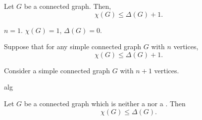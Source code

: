 \begin{frame}{}
  \begin{theorem}
    Let $G$ be a  connected graph. Then,
    \[
      \chi(G) \le \Delta(G) + 1.
    \]
  \end{theorem}

  \pause
  \begin{center}

    \pause
    \vspace{0.20cm}
    \begin{description}
      \setlength{\itemsep}{5pt}
      \item[Basis Step:] $n = 1$. $\chi(G) = 1$, $\Delta(G) = 0$.
      \item[Induction Hypothesis:] Suppose that for any simple connected graph $G$
        with $n$ vertices,
        \[
          \chi(G) \le \Delta(G) + 1.
        \]
      \item[Induction Step:] Consider a simple connected graph $G$ with $n+1$ vertices.
    \end{description}
  \end{center}
\end{frame}

\begin{frame}{}
  alg
\end{frame}

\begin{frame}{}
  \begin{theorem}
    Let $G$ be a  connected graph which is neither a 
    nor a . Then
    \[
      \chi(G) \le \Delta(G).
    \]
  \end{theorem}

  \pause
\end{frame}
